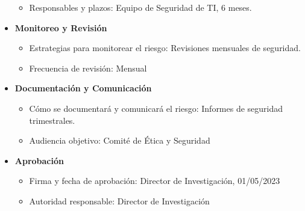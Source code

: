 \begin{itemize}
\begin{itemize}
      \item Responsables y plazos: Equipo de Seguridad de TI, 6 meses.
    \end{itemize}
  \item \textbf{Monitoreo y Revisión}
    \begin{itemize}
      \item Estrategias para monitorear el riesgo: Revisiones mensuales de seguridad.
      \item Frecuencia de revisión: Mensual
    \end{itemize}
  \item \textbf{Documentación y Comunicación}
    \begin{itemize}
      \item Cómo se documentará y comunicará el riesgo: Informes de seguridad trimestrales.
      \item Audiencia objetivo: Comité de Ética y Seguridad
    \end{itemize}
  \item \textbf{Aprobación}
    \begin{itemize}
      \item Firma y fecha de aprobación: Director de Investigación, 01/05/2023
      \item Autoridad responsable: Director de Investigación
    \end{itemize}
\end{itemize}
